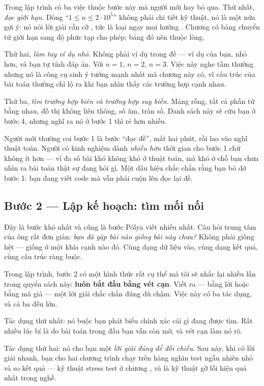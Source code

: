 \documentclass[../../algorithm.tex]{subfiles}
\begin{document}
Trong lập trình có ba việc thuộc bước này mà người mới hay bỏ qua. Thứ nhất, \emph{đọc giới hạn}. Dòng ``\(1 \le n \le 2\cdot 10^5\)'' không phải chi tiết kỹ thuật, nó là một nửa gợi ý: nó nói lời giải cần cỡ , tức là loại ngay mọi hướng . Chương  có bảng chuyển từ giới hạn sang độ phức tạp cho phép; bảng đó nên thuộc lòng.

Thứ hai, \emph{làm tay ví dụ nhỏ}. Không phải ví dụ trong đề --- ví dụ của bạn, nhỏ hơn, và bạn tự tính đáp án. Với \(n=1\), \(n=2\), \(n=3\). Việc này nghe tầm thường nhưng nó là công cụ sinh ý tưởng mạnh nhất mà chương này có, vì cấu trúc của bài toán thường chỉ lộ ra khi bạn nhìn thấy các trường hợp cạnh nhau.

Thứ ba, \emph{tìm trường hợp biên và trường hợp suy biến}. Mảng rỗng, tất cả phần tử bằng nhau, đồ thị không liên thông, số âm, tràn số. Danh sách này sẽ cứu bạn ở bước 4, nhưng nghĩ ra nó ở bước 1 thì rẻ hơn nhiều.

\begin{cambay}
Người mới thường coi bước 1 là bước ``đọc đề'', mất hai phút, rồi lao vào nghĩ thuật toán. Người có kinh nghiệm dành \emph{nhiều hơn} thời gian cho bước 1 chứ không ít hơn --- vì đa số bài khó không khó ở thuật toán, mà khó ở chỗ bạn chưa nhìn ra bài toán thật sự đang hỏi gì. Một dấu hiệu chắc chắn rằng bạn bỏ dở bước 1: bạn đang viết code mà vẫn phải cuộn lên đọc lại đề.
\end{cambay}

\subsection{Bước 2 --- Lập kế hoạch: tìm mối nối}

Đây là bước khó nhất và cũng là bước Pólya viết nhiều nhất. Câu hỏi trung tâm của ông rất đơn giản: \emph{bạn đã gặp bài nào giống bài này chưa?} Không phải giống hệt --- giống ở một khía cạnh nào đó. Cùng dạng dữ liệu vào, cùng dạng kết quả, cùng cấu trúc ràng buộc.

Trong lập trình, bước 2 có một hình thức rất cụ thể mà tôi sẽ nhắc lại nhiều lần trong quyển sách này: \textbf{luôn bắt đầu bằng vét cạn}. Viết ra --- bằng lời hoặc bằng mã giả --- một lời giải chắc chắn đúng dù chậm. Việc này có ba tác dụng, và cả ba đều lớn.

Tác dụng thứ nhất: nó buộc bạn phát biểu chính xác cái gì đang được tìm. Rất nhiều lúc bí là do bài toán trong đầu bạn vẫn còn mờ, và vét cạn làm nó rõ.

Tác dụng thứ hai: nó cho bạn một \emph{lời giải đúng để đối chiếu}. Sau này, khi có lời giải nhanh, bạn cho hai chương trình chạy trên hàng nghìn test ngẫu nhiên nhỏ và so kết quả --- kỹ thuật stress test ở chương , và là kỹ thuật gỡ lỗi hiệu quả nhất trong nghề.
\end{document}
